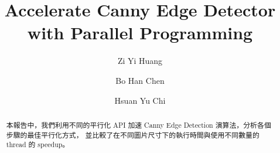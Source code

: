 \documentclass[sigconf,nonacm]{acmart}
\begin{document}
\title{Accelerate Canny Edge Detector with Parallel Programming}

\author{Zi Yi Huang}

\author{Bo Han Chen}

\author{Hsuan Yu Chi}


\begin{abstract}
  本報告中，我們利用不同的平行化 API 加速 Canny Edge Detection 演算法，分析各個步驟的最佳平行化方式，
  並比較了在不同圖片尺寸下的執行時間與使用不同數量的 thread 的 speedup。
\end{abstract}

\end{document}

